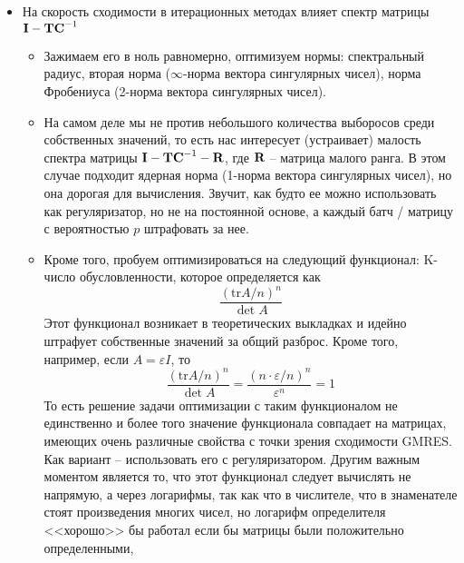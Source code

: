 \documentclass[a4paper, 12pt]{article}
\begin{document}
\begin{itemize}
    \item На скорость сходимости в итерационных методах
        влияет спектр матрицы $\textbf I - \textbf T\textbf C^{-1}$
        \begin{itemize}
            \item Зажимаем его в ноль равномерно,
                оптимизуем нормы: спектральный радиус,
                вторая норма ($\infty$-норма вектора
                сингулярных чисел), норма Фробениуса (2-норма вектора 
                сингулярных чисел).
            \item На самом деле мы не против небольшого количества
                выборосов среди собственных значений, то есть
                нас интересует (устраивает) малость спектра матрицы
                $\textbf I - \textbf T\textbf C^{-1} - \textbf R$, где
                $\textbf R$ -- матрица малого ранга. 
                В этом случае подходит ядерная норма (1-норма вектора
                сингулярных чисел), но она дорогая для
                вычисления. Звучит, как будто ее можно использовать
                как регуляризатор, но не на постоянной основе, а каждый
                батч / матрицу с вероятностью $p$ штрафовать за нее.
            \item Кроме того, пробуем оптимизироваться на 
                следующий функционал: K-число обусловленности, которое
                определяется как
                \[
                    \frac{(\mathrm{tr} A/n)^n}{\det A}
                \]
                Этот функционал возникает в теоретических выкладках и
                идейно штрафует собственные значений за общий разброс.
                Кроме того, например, если $A=\varepsilon I$, то
                \[
                    \frac{(\mathrm{tr} A/n)^n}{\det A}=
                    \frac{(n\cdot \varepsilon / n)^n}{\varepsilon^n}=1
                \]
                То есть решение задачи оптимизации с таким функционалом
                не единственно и более того значение функционала
                совпадает на матрицах, имеющих
                очень различные свойства с точки зрения сходимости GMRES.
                Как вариант -- использовать его с регуляризатором.
                Другим важным моментом является то, что
                этот функционал следует вычислять не напрямую, а через
                логарифмы, так как что в числителе, что в 
                знаменателе стоят произведения многих чисел,
                но логарифм определителя <<хорошо>> бы работал
                если бы матрицы были положительно определенными, 

\end{itemize}
\end{itemize}
\end{document}
